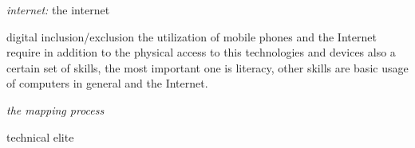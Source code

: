 {\em internet:} the internet 

{\bold digital inclusion/exclusion} the utilization of mobile phones and the Internet require in addition to the physical access to this technologies and devices also a certain set of skills, the most important one is literacy, other skills are basic usage of computers in general and the Internet.


{\em the mapping process}

{\bold technical elite}
